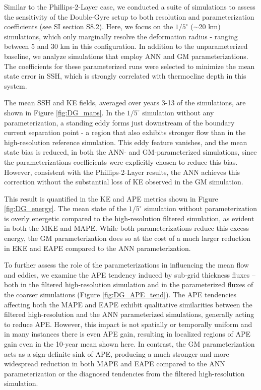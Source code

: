\documentclass[draft]{agujournal2019}
\begin{document}
Similar to the Phillips-2-Layer case, we conducted a suite of simulations to assess the sensitivity of the Double-Gyre setup to both resolution and parameterization coefficients (see SI section S8.2). Here, we focus on the $1/5^\circ$ ($\sim$20 km) simulations, which only marginally resolve the deformation radius - ranging between 5 and 30 km in this configuration. In addition to the unparameterized baseline, we analyze simulations that employ ANN and GM parameterizations. The coefficients for these parameterized runs were selected to minimize the mean state error in SSH, which is strongly correlated with thermocline depth in this system.

The mean SSH and KE fields, averaged over years 3-13 of the simulations, are shown in Figure \ref{fig:DG_maps}. In the $1/5^\circ$ simulation without any parameterization, a standing eddy forms just downstream of the boundary current separation point - a region that also exhibits stronger flow than in the high-resolution reference simulation. This eddy feature vanishes, and the mean state bias is reduced, in both the ANN- and GM-parameterized simulations, since the parameterizations coefficients were explicitly chosen to reduce this bias. However, consistent with the Phillips-2-Layer results, the ANN achieves this correction without the substantial loss of KE observed in the GM simulation.

This result is quantified in the KE and APE metrics shown in Figure \ref{fig:DG_energy}. The mean state of the $1/5^\circ$ simulation without parameterization is overly energetic compared to the high-resolution filtered simulation, as evident in both the MKE and MAPE. While both parameterizations reduce this excess energy, the GM parameterization does so at the cost of a much larger reduction in EKE and EAPE compared to the ANN parameterization.

To further assess the role of the parameterizations in influencing the mean flow and eddies, we examine the APE tendency induced by sub-grid thickness fluxes -- both in the filtered high-resolution simulation and in the parameterized fluxes of the coarser simulations (Figure \ref{fig:DG_APE_tend}). The APE tendencies affecting both the MAPE and EAPE exhibit qualitative similarities between the filtered high-resolution and the ANN parameterized simulations, generally acting to reduce APE. However, this impact is not spatially or temporally uniform and in many instances there is even APE gain, resulting in localized regions of APE gain even in the 10-year mean shown here.
In contrast, the GM parameterization acts as a sign-definite sink of APE, producing a much stronger and more widespread reduction in both MAPE and EAPE compared to the ANN parameterization or the diagnosed tendencies from the filtered high-resolution simulation.
\end{document}
